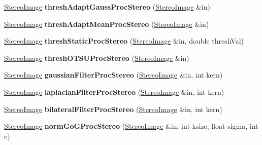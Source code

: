 \begin{DoxyCompactItemize}
\item 
\hyperlink{classStereoImage}{Stereo\+Image} {\bfseries thresh\+Adapt\+Gauss\+Proc\+Stereo} (\hyperlink{classStereoImage}{Stereo\+Image} \&in)\hypertarget{classMorphOps_a2d05a7def8abecdb3c02712db72b789c}{}\label{classMorphOps_a2d05a7def8abecdb3c02712db72b789c}

\item 
\hyperlink{classStereoImage}{Stereo\+Image} {\bfseries thresh\+Adapt\+Mean\+Proc\+Stereo} (\hyperlink{classStereoImage}{Stereo\+Image} \&in)\hypertarget{classMorphOps_a10a99bfdfb44d16cefc99ac1b787dc1c}{}\label{classMorphOps_a10a99bfdfb44d16cefc99ac1b787dc1c}

\item 
\hyperlink{classStereoImage}{Stereo\+Image} {\bfseries thresh\+Static\+Proc\+Stereo} (\hyperlink{classStereoImage}{Stereo\+Image} \&in, double thresh\+Val)\hypertarget{classMorphOps_ae92708fd4d4ad05588103c24912df25e}{}\label{classMorphOps_ae92708fd4d4ad05588103c24912df25e}

\item 
\hyperlink{classStereoImage}{Stereo\+Image} {\bfseries thresh\+O\+T\+S\+U\+Proc\+Stereo} (\hyperlink{classStereoImage}{Stereo\+Image} \&in)\hypertarget{classMorphOps_ae3d0dbe4231d13af0002a406476d7617}{}\label{classMorphOps_ae3d0dbe4231d13af0002a406476d7617}

\item 
\hyperlink{classStereoImage}{Stereo\+Image} {\bfseries gaussian\+Filter\+Proc\+Stereo} (\hyperlink{classStereoImage}{Stereo\+Image} \&in, int kern)\hypertarget{classMorphOps_a84c304f798a1011bd737bcf113332734}{}\label{classMorphOps_a84c304f798a1011bd737bcf113332734}

\item 
\hyperlink{classStereoImage}{Stereo\+Image} {\bfseries laplacian\+Filter\+Proc\+Stereo} (\hyperlink{classStereoImage}{Stereo\+Image} \&in, int kern)\hypertarget{classMorphOps_aaeb822e46a359a735280ca46cfda557f}{}\label{classMorphOps_aaeb822e46a359a735280ca46cfda557f}

\item 
\hyperlink{classStereoImage}{Stereo\+Image} {\bfseries bilateral\+Filter\+Proc\+Stereo} (\hyperlink{classStereoImage}{Stereo\+Image} \&in, int kern)\hypertarget{classMorphOps_a30012ada0a9b24a1226552bc9eb5a201}{}\label{classMorphOps_a30012ada0a9b24a1226552bc9eb5a201}

\item 
\hyperlink{classStereoImage}{Stereo\+Image} {\bfseries norm\+Go\+G\+Proc\+Stereo} (\hyperlink{classStereoImage}{Stereo\+Image} \&in, int ksize, float sigma, int c)\hypertarget{classMorphOps_ab309bf19cd2335a4e3142408507d0a90}{}\label{classMorphOps_ab309bf19cd2335a4e3142408507d0a90}


\end{DoxyCompactItemize}
